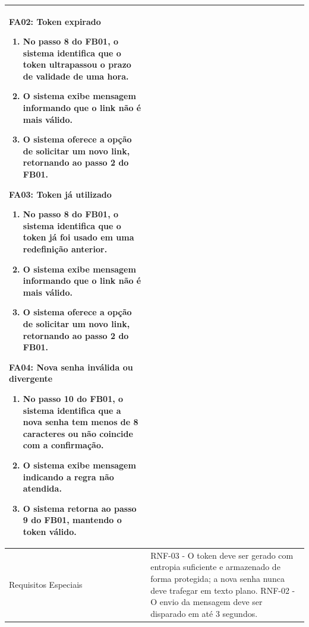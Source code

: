 \begin{longtable}{ >{\raggedright}p{2.8cm} | >{\raggedright\arraybackslash}p{10.7cm} }
\textbf{FA02:} Token expirado
\vspace{2pt}
\begin{enumerate}[nosep,leftmargin=1.2em,topsep=0pt,partopsep=0pt,parsep=0pt,itemsep=0pt,after=\vspace{2pt}]
    \item No passo 8 do FB01, o sistema identifica que o token ultrapassou o prazo de validade de uma hora.
    \item O sistema exibe mensagem informando que o link não é mais válido.
    \item O sistema oferece a opção de solicitar um novo link, retornando ao passo 2 do FB01.
\end{enumerate}

\textbf{FA03:} Token já utilizado
\vspace{2pt}
\begin{enumerate}[nosep,leftmargin=1.2em,topsep=0pt,partopsep=0pt,parsep=0pt,itemsep=0pt,after=\vspace{2pt}]
    \item No passo 8 do FB01, o sistema identifica que o token já foi usado em uma redefinição anterior.
    \item O sistema exibe mensagem informando que o link não é mais válido.
    \item O sistema oferece a opção de solicitar um novo link, retornando ao passo 2 do FB01.
\end{enumerate}

\textbf{FA04:} Nova senha inválida ou divergente
\vspace{2pt}
\begin{enumerate}[nosep,leftmargin=1.2em,topsep=0pt,partopsep=0pt,parsep=0pt,itemsep=0pt,after=\vspace{2pt}]
    \item No passo 10 do FB01, o sistema identifica que a nova senha tem menos de 8 caracteres ou não coincide com a confirmação.
    \item O sistema exibe mensagem indicando a regra não atendida.
    \item O sistema retorna ao passo 9 do FB01, mantendo o token válido.
\end{enumerate}
\mbox{} \\ \hline

Requisitos Especiais & RNF-03 - O token deve ser gerado com entropia suficiente e armazenado de forma protegida; a nova senha nunca deve trafegar em texto plano. RNF-02 - O envio da mensagem deve ser disparado em até 3 segundos. \\ \hline


\end{longtable}
